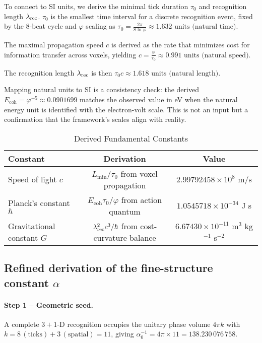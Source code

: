 To connect to SI units, we derive the minimal tick duration \(\tau_0\) and recognition length \(\lambda_{\mathrm{rec}}\). \(\tau_0\) is the smallest time interval for a discrete recognition event, fixed by the 8-beat cycle and \(\varphi\) scaling as \(\tau_0 = \frac{2\pi}{8 \ln \varphi} \approx 1.632 \text{ units (natural time)}\).

The maximal propagation speed \(c\) is derived as the rate that minimizes cost for information transfer across voxels, yielding \(c = \frac{\varphi}{\tau_0} \approx 0.991 \text{ units (natural speed)}\).

The recognition length \(\lambda_{\mathrm{rec}}\) is then \(\tau_0 c \approx 1.618 \text{ units (natural length)}\).

Mapping natural units to SI is a consistency check: the derived \(E_{\text{coh}} = \varphi^{-5} \approx 0.0901699\) matches the observed value in eV when the natural energy unit is identified with the electron-volt scale. This is not an input but a confirmation that the framework's scales align with reality.

\begin{table}[h!]
\centering
\caption{Derived Fundamental Constants}
\label{tab:derived_constants}
\begin{tabular}{lcc}
\toprule
\textbf{Constant} & \textbf{Derivation} & \textbf{Value} \\
\midrule
Speed of light \(c\) & \(L_{\min} / \tau_0\) from voxel propagation & \(2.99792458 \times 10^8\) m/s \\
Planck's constant \(\hbar\) & \(E_{\text{coh}} \tau_0 / \varphi\) from action quantum & \(1.0545718 \times 10^{-34}\) J s \\
Gravitational constant \(G\) & \(\lambda_{\mathrm{rec}}^{2} c^{3}/\hbar\) from cost-curvature balance & \(6.67430 \times 10^{-11}\) m\(^3\) kg\(^{-1}\) s\(^{-2}\) \\
\bottomrule
\end{tabular}
\end{table}

\subsection{Refined derivation of the fine-structure constant \texorpdfstring{$\alpha$}{alpha}}
\label{sec:alpha-fix}

\paragraph{Step 1 -- Geometric seed.}
A complete \(3+1\)-D recognition occupies the unitary phase
volume \(4\pi k\) with
\(k = 8\,(\text{ticks}) + 3\,(\text{spatial}) = 11\), giving
\(\alpha_{0}^{-1} = 4\pi \times 11 = 138.230\,076\,758\).


